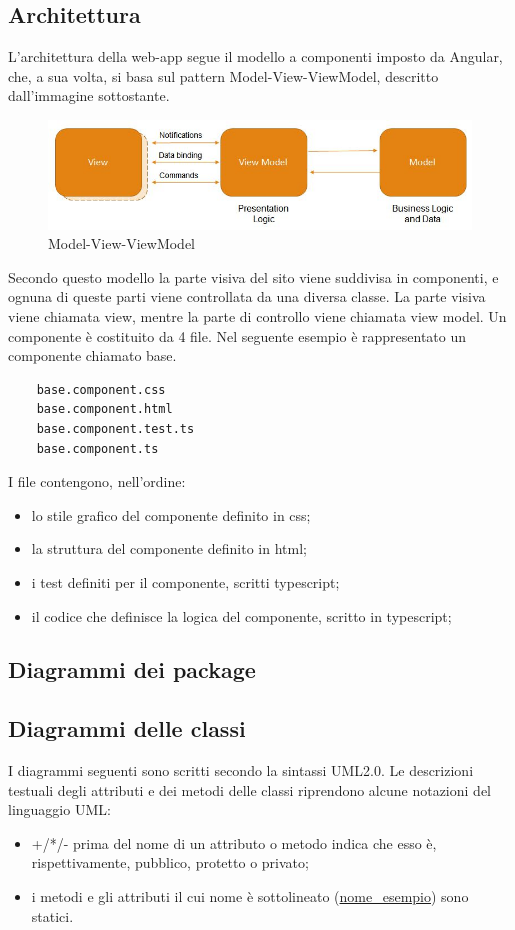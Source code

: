 \subsection{Architettura}
L'architettura della web-app segue il modello a componenti imposto da Angular, che, a sua volta, si basa sul pattern Model-View-ViewModel, descritto dall'immagine sottostante.
\begin{figure}[H]
	\centering
	\includegraphics[width=15cm]{res/images/mvvm.jpg}
	\caption{Model-View-ViewModel}
	\label{fig:Model-View-ViewModel}
\end{figure}
Secondo questo modello la parte visiva del sito viene suddivisa in componenti, e ognuna di queste parti viene controllata da una diversa classe.
La parte visiva viene chiamata view, mentre la parte di controllo viene chiamata view model.
Un componente è costituito da 4 file. Nel seguente esempio è rappresentato un componente chiamato base.
\begin{verbatim}
	base.component.css
	base.component.html
	base.component.test.ts
	base.component.ts
\end{verbatim}
I file contengono, nell'ordine:
\begin{itemize}
	\item lo stile grafico del componente definito in css;
	\item la struttura del componente definito in html;
	\item i test definiti per il componente, scritti typescript;
	\item il codice che definisce la logica del componente, scritto in typescript;
\end{itemize}

\subsection{Diagrammi dei package}
\subsection{Diagrammi delle classi}
I diagrammi seguenti sono scritti secondo la sintassi UML2.0. Le descrizioni testuali degli attributi e dei metodi delle classi riprendono alcune notazioni del linguaggio UML:
\begin{itemize}
	\item +/*/- prima del nome di un attributo o metodo indica che esso è, rispettivamente, pubblico, protetto o privato;
	\item i metodi e gli attributi il cui nome è sottolineato (\underline{nome\_esempio}) sono statici.
\end{itemize}
